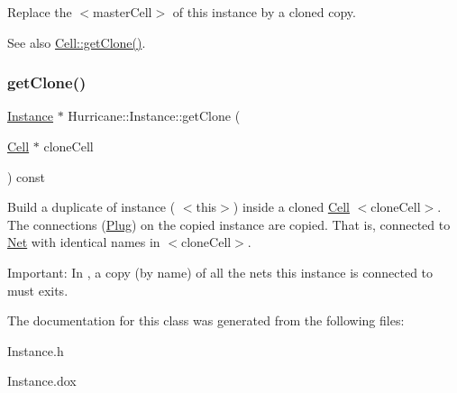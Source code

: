 Replace the {\ttfamily } $<$master\+Cell$>$ of this instance by a cloned copy.

\begin{DoxySeeAlso}{See also}
\mbox{\hyperlink{classHurricane_1_1Cell_a092f53c7f517ecc70d9ba375296c5d5b}{Cell\+::get\+Clone()}}. 
\end{DoxySeeAlso}
\mbox{\label{classHurricane_1_1Instance_ac5e111eef5767762e00f21fcd7a35702}} 
\subsubsection{\texorpdfstring{get\+Clone()}{getClone()}}
{\footnotesize\ttfamily \mbox{\hyperlink{classHurricane_1_1Instance}{Instance}} $\ast$ Hurricane\+::\+Instance\+::get\+Clone (\begin{DoxyParamCaption}\item[{\mbox{\hyperlink{classHurricane_1_1Cell}{Cell}} $\ast$}]{clone\+Cell }\end{DoxyParamCaption}) const}

Build a duplicate of instance ({\ttfamily } $<$this$>$) inside a cloned \mbox{\hyperlink{classHurricane_1_1Cell}{Cell}} {\ttfamily } $<$clone\+Cell$>$. The connections (\mbox{\hyperlink{classHurricane_1_1Plug}{Plug}}) on the copied instance are copied. That is, connected to \mbox{\hyperlink{classHurricane_1_1Net}{Net}} with identical names in {\ttfamily } $<$clone\+Cell$>$.

\begin{DoxyParagraph}{Important\+: In {\ttfamily }, a copy (by name) of all the nets this instance}
is connected to must exits. 
\end{DoxyParagraph}


The documentation for this class was generated from the following files\+:\begin{DoxyCompactItemize}
\item 
Instance.\+h\item 
Instance.\+dox\end{DoxyCompactItemize}

